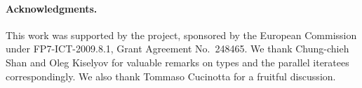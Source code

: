 %

\paragraph{Acknowledgments.}
This work was supported by the \soos project, sponsored by the European Commission under FP7-ICT-2009.8.1, Grant Agreement No.~248465.
We thank Chung-chieh Shan and Oleg Kiselyov for valuable remarks on
 types and the parallel iteratees correspondingly.
We also thank Tommaso Cucinotta for a fruitful discussion.

